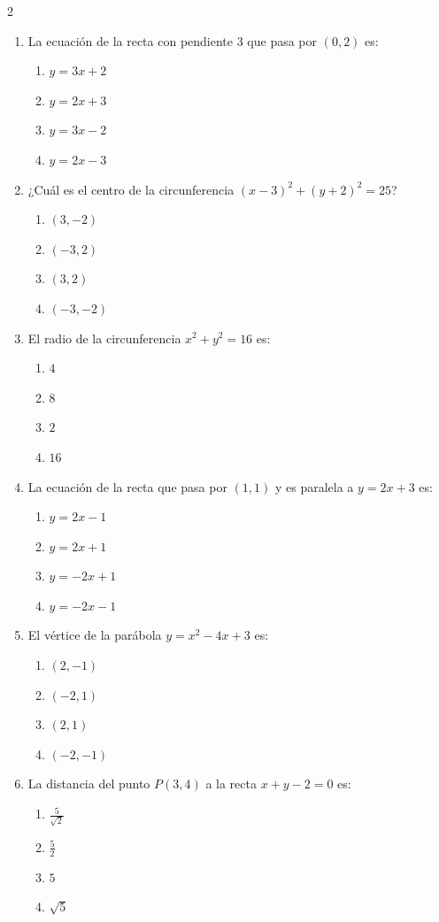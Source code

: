 \documentclass[10pt]{article}
\begin{document}
\begin{multicols}{2}
\begin{enumerate}
\item La ecuación de la recta con pendiente $3$ que pasa por $(0,2)$ es:
\begin{enumerate}[label=(\alph*)]
\item $y = 3x + 2$
\item $y = 2x + 3$
\item $y = 3x - 2$
\item $y = 2x - 3$
\end{enumerate}

\item ¿Cuál es el centro de la circunferencia $(x-3)^2 + (y+2)^2 = 25$?
\begin{enumerate}[label=(\alph*)]
\item $(3,-2)$
\item $(-3,2)$
\item $(3,2)$
\item $(-3,-2)$
\end{enumerate}

\item El radio de la circunferencia $x^2 + y^2 = 16$ es:
\begin{enumerate}[label=(\alph*)]
\item $4$
\item $8$
\item $2$
\item $16$
\end{enumerate}

\item La ecuación de la recta que pasa por $(1,1)$ y es paralela a $y = 2x + 3$ es:
\begin{enumerate}[label=(\alph*)]
\item $y = 2x - 1$
\item $y = 2x + 1$
\item $y = -2x + 1$
\item $y = -2x - 1$
\end{enumerate}

\item El vértice de la parábola $y = x^2 - 4x + 3$ es:
\begin{enumerate}[label=(\alph*)]
\item $(2,-1)$
\item $(-2,1)$
\item $(2,1)$
\item $(-2,-1)$
\end{enumerate}

\item La distancia del punto $P(3,4)$ a la recta $x + y - 2 = 0$ es:
\begin{enumerate}[label=(\alph*)]
\item $\frac{5}{\sqrt{2}}$
\item $\frac{5}{2}$
\item $5$
\item $\sqrt{5}$
\end{enumerate}


\end{enumerate}
\end{multicols}
\end{document}
